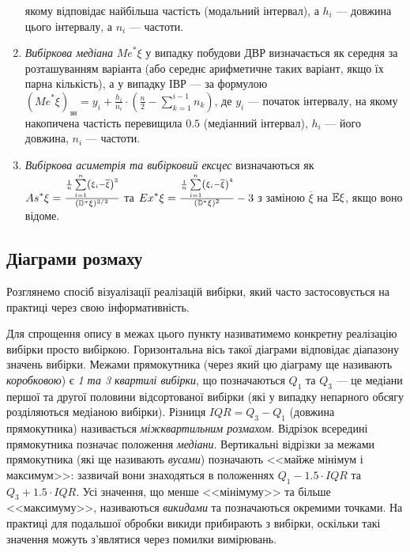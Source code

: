 \begin{enumerate}
    якому відповідає найбільша частість (модальний інтервал), а $h_i$ --- довжина цього інтервалу, а $n_i$ --- частоти.
    \item \emph{Вибіркова медіана} ${Me}^* \xi$ у випадку побудови ДВР визначається як середня за розташуванням варіанта (або середнє арифметичне 
    таких варіант, якщо їх парна кількість), а у випадку ІВР --- за формулою 
    $({Me}^* \xi)_{\text{зн}} = y_i + \frac{h_i}{n_i} \cdot \left(\frac{n}{2} - \sum\limits_{k=1}^{i-1} n_k \right)$, де 
    $y_i$ --- початок інтервалу, на якому накопичена частість перевищила $0.5$ (медіанний інтервал), $h_i$ --- його довжина,
    $n_i$ --- частоти.
    \item \emph{Вибіркова асиметрія та вибірковий ексцес} визначаються як 
    ${As}^* \xi = \frac{\frac{1}{n}\sum\limits_{i=1}^n \left(\xi_i - \overline{\xi} \right)^3}{(\mathbb{D}^*\xi)^{3/2}}$ та
    ${Ex}^* \xi = \frac{\frac{1}{n}\sum\limits_{i=1}^n \left(\xi_i - \overline{\xi} \right)^4}{(\mathbb{D}^*\xi)^{2}} - 3$ з заміною
    $\overline{\xi}$ на $\mathbb{E}\xi$, якщо воно відоме.
\end{enumerate}

\subsection{Діаграми розмаху}
Розглянемо спосіб візуалізації реалізацій вибірки, який часто застосовується на практиці через свою інформативність.
\begin{center}
\end{center}
Для спрощення опису в межах цього пункту називатимемо конкретну реалізацію вибірки просто вибіркою.
Горизонтальна вісь такої діаграми відповідає діапазону значень вибірки. Межами прямокутника (через який цю діаграму ще називають
\emph{коробковою}) є \emph{1 та 3 квартилі вибірки}, що позначаються $Q_1$ та $Q_3$ --- це медіани першої та другої половини відсортованої вибірки (які у випадку
непарного обсягу розділяються медіаною вибірки).
Різниця ${IQR} = Q_3 - Q_1$ (довжина прямокутника) називається \emph{міжквартильним розмахом}. Відрізок всередині прямокутника позначає положення \emph{медіани}.
Вертикальні відрізки за межами прямокутника (які ще називають \emph{вусами}) позначають <<майже мінімум і максимум>>: зазвичай вони знаходяться
в положеннях $Q_1 - 1.5\cdot{IQR}$ та $Q_3 + 1.5\cdot{IQR}$. Усі значення, що менше <<мінімуму>> та більше <<максимуму>>, називаються \emph{викидами} та 
позначаються окремими точками. На практиці для подальшої обробки викиди прибирають з вибірки, оскільки такі значення можуть з'являтися через помилки вимірювань.

